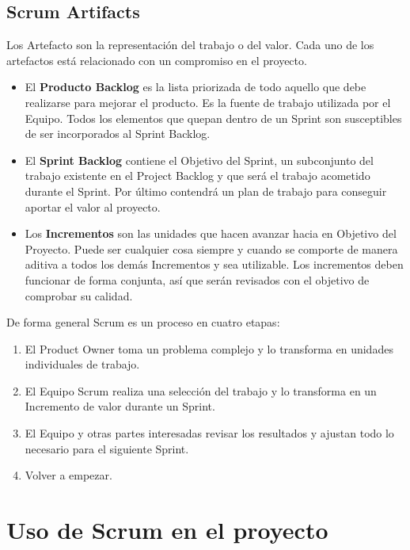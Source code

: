 \subsection{Scrum Artifacts}

Los Artefacto son la representación del trabajo o del valor. Cada uno de los artefactos está relacionado con un compromiso en el proyecto.

\begin{itemize}
    \item El \textbf{Producto Backlog} es la lista priorizada de todo aquello que debe realizarse para mejorar el producto. Es la fuente de trabajo utilizada por el Equipo. Todos los elementos que quepan dentro de un Sprint son susceptibles de ser incorporados al Sprint Backlog.
    \item El \textbf{Sprint Backlog} contiene el Objetivo del Sprint, un subconjunto del trabajo existente en el Project Backlog y que será el trabajo acometido durante el Sprint. Por último contendrá un plan de trabajo para conseguir aportar el valor al proyecto.
    \item Los \textbf{Incrementos} son las unidades que hacen avanzar hacia en Objetivo del Proyecto. Puede ser cualquier cosa siempre y cuando se comporte de manera aditiva a todos los demás Incrementos y sea utilizable. Los incrementos deben funcionar de forma conjunta, así que serán revisados con el objetivo de comprobar su calidad.
\end{itemize}

De forma general Scrum es un proceso en cuatro etapas:

\begin{enumerate}
    \item El Product Owner toma un problema complejo y lo transforma en unidades individuales de trabajo.
    \item El Equipo Scrum realiza una selección del trabajo y lo transforma en un Incremento de valor durante un Sprint.
    \item El Equipo y otras partes interesadas revisar los resultados y ajustan todo lo necesario para el siguiente Sprint.
    \item Volver a empezar.
\end{enumerate}

\section{Uso de Scrum en el proyecto}
\label{sec:uso-scrum-en-el-proyecto}

